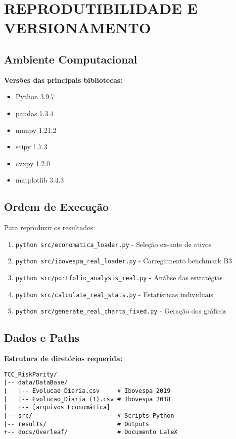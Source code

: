 \section{REPRODUTIBILIDADE E VERSIONAMENTO}

\subsection{Ambiente Computacional}

\textbf{Versões das principais bibliotecas:}
\begin{itemize}
    \item Python 3.9.7
    \item pandas 1.3.4  
    \item numpy 1.21.2
    \item scipy 1.7.3
    \item cvxpy 1.2.0
    \item matplotlib 3.4.3
\end{itemize}

\subsection{Ordem de Execução}

Para reproduzir os resultados:

\begin{enumerate}
    \item \texttt{python src/economatica\_loader.py} - Seleção ex-ante de ativos
    \item \texttt{python src/ibovespa\_real\_loader.py} - Carregamento benchmark B3
    \item \texttt{python src/portfolio\_analysis\_real.py} - Análise das estratégias
    \item \texttt{python src/calculate\_real\_stats.py} - Estatísticas individuais
    \item \texttt{python src/generate\_real\_charts\_fixed.py} - Geração dos gráficos
\end{enumerate}

\subsection{Dados e Paths}

\textbf{Estrutura de diretórios requerida:}
\begin{verbatim}
TCC_RiskParity/
|-- data/DataBase/
|   |-- Evolucao_Diaria.csv     # Ibovespa 2019
|   |-- Evolucao_Diaria (1).csv # Ibovespa 2018  
|   +-- [arquivos Economática]
|-- src/                        # Scripts Python
|-- results/                    # Outputs
+-- docs/Overleaf/              # Documento LaTeX
\end{verbatim}

